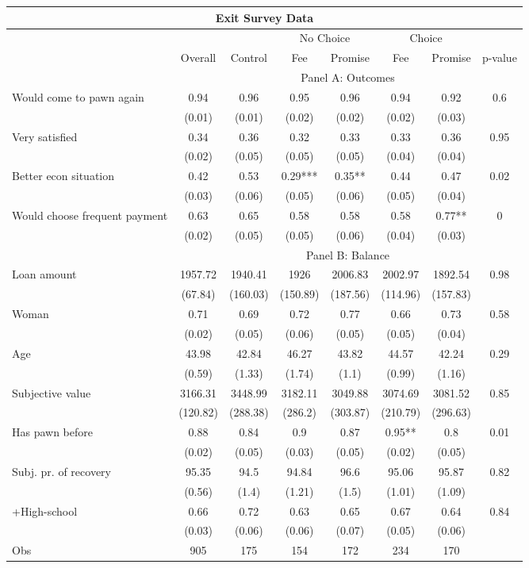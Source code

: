 \begin{tabular}{lccccccc}
\toprule
\multicolumn{8}{c}{Exit Survey Data} \\
\midrule
\midrule
      &       &       & \multicolumn{2}{c}{No Choice } & \multicolumn{2}{c}{Choice} &  \\
\midrule
\midrule
      & Overall & Control & Fee   & Promise & Fee   & Promise & p-value \\
\midrule
      & \multicolumn{7}{c}{Panel A: Outcomes} \\
\midrule
\midrule
Would come to pawn again & 0.94  & 0.96  & 0.95  & 0.96  & 0.94  & 0.92  & 0.6 \\
      & (0.01) & (0.01) & (0.02) & (0.02) & (0.02) & (0.03) &  \\
Very satisfied & 0.34  & 0.36  & 0.32  & 0.33  & 0.33  & 0.36  & 0.95 \\
      & (0.02) & (0.05) & (0.05) & (0.05) & (0.04) & (0.04) &  \\
Better econ situation & 0.42  & 0.53  & 0.29*** & 0.35** & 0.44  & 0.47  & 0.02 \\
      & (0.03) & (0.06) & (0.05) & (0.06) & (0.05) & (0.04) &  \\
Would choose frequent payment & 0.63  & 0.65  & 0.58  & 0.58  & 0.58  & 0.77** & 0 \\
      & (0.02) & (0.05) & (0.05) & (0.06) & (0.04) & (0.03) &  \\
\midrule
      & \multicolumn{7}{c}{Panel B: Balance} \\
\midrule
\midrule
Loan amount  & 1957.72 & 1940.41 & 1926  & 2006.83 & 2002.97 & 1892.54 & 0.98 \\
      & (67.84) & (160.03) & (150.89) & (187.56) & (114.96) & (157.83) &  \\
Woman & 0.71  & 0.69  & 0.72  & 0.77  & 0.66  & 0.73  & 0.58 \\
      & (0.02) & (0.05) & (0.06) & (0.05) & (0.05) & (0.04) &  \\
Age   & 43.98 & 42.84 & 46.27 & 43.82 & 44.57 & 42.24 & 0.29 \\
      & (0.59) & (1.33) & (1.74) & (1.1) & (0.99) & (1.16) &  \\
Subjective value & 3166.31 & 3448.99 & 3182.11 & 3049.88 & 3074.69 & 3081.52 & 0.85 \\
      & (120.82) & (288.38) & (286.2) & (303.87) & (210.79) & (296.63) &  \\
Has pawn before & 0.88  & 0.84  & 0.9   & 0.87  & 0.95** & 0.8   & 0.01 \\
      & (0.02) & (0.05) & (0.03) & (0.05) & (0.02) & (0.05) &  \\
Subj. pr. of recovery & 95.35 & 94.5  & 94.84 & 96.6  & 95.06 & 95.87 & 0.82 \\
      & (0.56) & (1.4) & (1.21) & (1.5) & (1.01) & (1.09) &  \\
+High-school & 0.66  & 0.72  & 0.63  & 0.65  & 0.67  & 0.64  & 0.84 \\
      & (0.03) & (0.06) & (0.06) & (0.07) & (0.05) & (0.06) &  \\
\midrule
Obs   & 905   & 175   & 154   & 172   & 234   & 170   &  \\
\bottomrule
\bottomrule
\end{tabular}%
